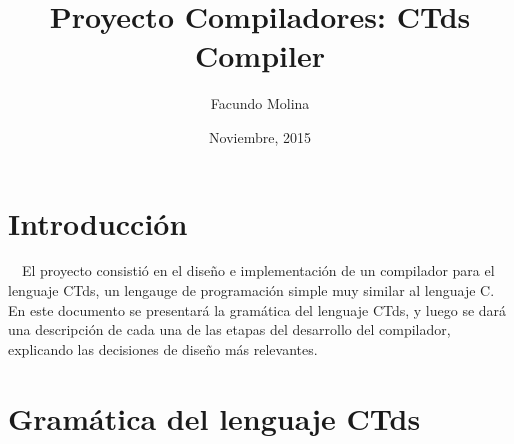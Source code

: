 \documentclass[11pt,a4paper]{article}
\author{Facundo Molina}
\begin{document}
\title{Proyecto Compiladores: CTds Compiler}
\date{Noviembre, 2015}
\maketitle

\section{Introducción}
\ \ El proyecto consistió en el diseño e implementación de un compilador para el lenguaje CTds, un lengauge de programación simple muy similar al lenguaje C.  En este documento se presentará la gramática del lenguaje CTds, y luego se dará una descripción de cada una de las etapas del desarrollo del compilador, explicando las decisiones de diseño más relevantes.

\section{Gramática del lenguaje CTds}
\end{document}
